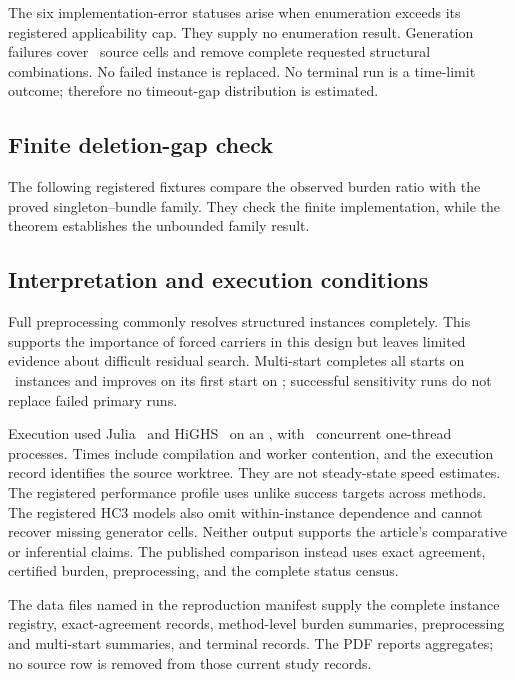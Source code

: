 The six implementation-error statuses arise when enumeration exceeds its
registered applicability cap. They supply no enumeration result. Generation
failures cover \AORGenerationFailedInstances\ source cells and remove complete
requested structural combinations. No failed instance is replaced. No terminal
run is a time-limit outcome; therefore no timeout-gap distribution is estimated.

\subsection{Finite deletion-gap check}

The following registered fixtures compare the observed burden ratio with the
proved singleton--bundle family. They check the finite implementation, while
the theorem establishes the unbounded family result.


\subsection{Interpretation and execution conditions}

Full preprocessing commonly resolves structured instances completely. This
supports the importance of forced carriers in this design but leaves limited
evidence about difficult residual search. Multi-start completes all starts on
\AORMultistartComplete\ instances and improves on its first start on
\AORMultistartImproved; successful sensitivity runs do not replace failed
primary runs.

Execution used Julia \AORJuliaVersion\ and HiGHS \AORHiGHSVersion\ on an
\AORCPU, with \AORWorkerCount\ concurrent one-thread processes. Times include
compilation and worker contention, and the execution record identifies the
source worktree. They are not steady-state speed estimates. The registered
performance profile uses unlike success targets across methods. The registered
HC3 models also omit within-instance dependence and cannot recover missing
generator cells. Neither output supports the article's comparative or
inferential claims. The published comparison instead uses exact agreement,
certified burden, preprocessing, and the complete status census.

The data files named in the reproduction manifest supply the complete
instance registry, exact-agreement records, method-level burden summaries,
preprocessing and multi-start summaries, and terminal records. The PDF reports
aggregates; no source row is removed from those current study records.
